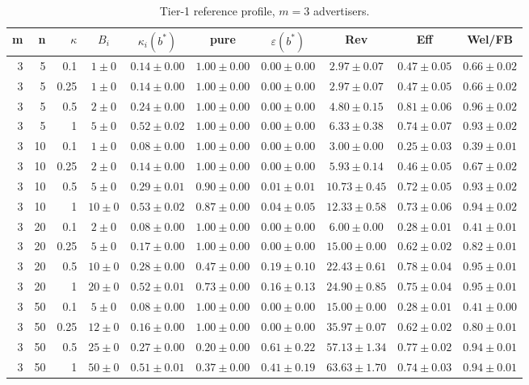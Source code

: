\begin{table}[htbp]
\centering
\scriptsize
\caption{Tier-1 reference profile, $m=3$ advertisers.}
\label{tab:tier1_m3}
\begin{tabular}{@{}rrrccccccc@{}}
\toprule
m & n & $\kappa$ & $B_i$ & $\kappa_i(b^*)$ & pure & $\varepsilon(b^*)$ & Rev & Eff & Wel/FB \\
\midrule
3 & 5 & 0.1 & $1 \pm 0$ & $0.14 \pm 0.00$ & $1.00 \pm 0.00$ & $0.00 \pm 0.00$ & $2.97 \pm 0.07$ & $0.47 \pm 0.05$ & $0.66 \pm 0.02$ \\
3 & 5 & 0.25 & $1 \pm 0$ & $0.14 \pm 0.00$ & $1.00 \pm 0.00$ & $0.00 \pm 0.00$ & $2.97 \pm 0.07$ & $0.47 \pm 0.05$ & $0.66 \pm 0.02$ \\
3 & 5 & 0.5 & $2 \pm 0$ & $0.24 \pm 0.00$ & $1.00 \pm 0.00$ & $0.00 \pm 0.00$ & $4.80 \pm 0.15$ & $0.81 \pm 0.06$ & $0.96 \pm 0.02$ \\
3 & 5 & 1 & $5 \pm 0$ & $0.52 \pm 0.02$ & $1.00 \pm 0.00$ & $0.00 \pm 0.00$ & $6.33 \pm 0.38$ & $0.74 \pm 0.07$ & $0.93 \pm 0.02$ \\
3 & 10 & 0.1 & $1 \pm 0$ & $0.08 \pm 0.00$ & $1.00 \pm 0.00$ & $0.00 \pm 0.00$ & $3.00 \pm 0.00$ & $0.25 \pm 0.03$ & $0.39 \pm 0.01$ \\
3 & 10 & 0.25 & $2 \pm 0$ & $0.14 \pm 0.00$ & $1.00 \pm 0.00$ & $0.00 \pm 0.00$ & $5.93 \pm 0.14$ & $0.46 \pm 0.05$ & $0.67 \pm 0.02$ \\
3 & 10 & 0.5 & $5 \pm 0$ & $0.29 \pm 0.01$ & $0.90 \pm 0.00$ & $0.01 \pm 0.01$ & $10.73 \pm 0.45$ & $0.72 \pm 0.05$ & $0.93 \pm 0.02$ \\
3 & 10 & 1 & $10 \pm 0$ & $0.53 \pm 0.02$ & $0.87 \pm 0.00$ & $0.04 \pm 0.05$ & $12.33 \pm 0.58$ & $0.73 \pm 0.06$ & $0.94 \pm 0.02$ \\
3 & 20 & 0.1 & $2 \pm 0$ & $0.08 \pm 0.00$ & $1.00 \pm 0.00$ & $0.00 \pm 0.00$ & $6.00 \pm 0.00$ & $0.28 \pm 0.01$ & $0.41 \pm 0.01$ \\
3 & 20 & 0.25 & $5 \pm 0$ & $0.17 \pm 0.00$ & $1.00 \pm 0.00$ & $0.00 \pm 0.00$ & $15.00 \pm 0.00$ & $0.62 \pm 0.02$ & $0.82 \pm 0.01$ \\
3 & 20 & 0.5 & $10 \pm 0$ & $0.28 \pm 0.00$ & $0.47 \pm 0.00$ & $0.19 \pm 0.10$ & $22.43 \pm 0.61$ & $0.78 \pm 0.04$ & $0.95 \pm 0.01$ \\
3 & 20 & 1 & $20 \pm 0$ & $0.52 \pm 0.01$ & $0.73 \pm 0.00$ & $0.16 \pm 0.13$ & $24.90 \pm 0.85$ & $0.75 \pm 0.04$ & $0.95 \pm 0.01$ \\
3 & 50 & 0.1 & $5 \pm 0$ & $0.08 \pm 0.00$ & $1.00 \pm 0.00$ & $0.00 \pm 0.00$ & $15.00 \pm 0.00$ & $0.28 \pm 0.01$ & $0.41 \pm 0.00$ \\
3 & 50 & 0.25 & $12 \pm 0$ & $0.16 \pm 0.00$ & $1.00 \pm 0.00$ & $0.00 \pm 0.00$ & $35.97 \pm 0.07$ & $0.62 \pm 0.02$ & $0.80 \pm 0.01$ \\
3 & 50 & 0.5 & $25 \pm 0$ & $0.27 \pm 0.00$ & $0.20 \pm 0.00$ & $0.61 \pm 0.22$ & $57.13 \pm 1.34$ & $0.77 \pm 0.02$ & $0.94 \pm 0.01$ \\
3 & 50 & 1 & $50 \pm 0$ & $0.51 \pm 0.01$ & $0.37 \pm 0.00$ & $0.41 \pm 0.19$ & $63.63 \pm 1.70$ & $0.74 \pm 0.03$ & $0.94 \pm 0.01$ \\
\bottomrule
\end{tabular}
\end{table}
